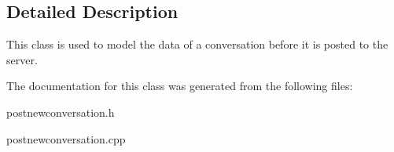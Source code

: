 \subsection{Detailed Description}
This class is used to model the data of a conversation before it is posted to the server. 

The documentation for this class was generated from the following files\-:\begin{DoxyCompactItemize}
\item 
postnewconversation.\-h\item 
postnewconversation.\-cpp\end{DoxyCompactItemize}
